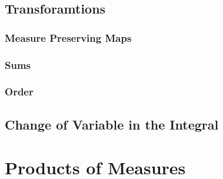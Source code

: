 \documentclass[12pt]{scrartcl}
\renewcommand{\.}{\; . \;}
\begin{document}
\subsection{Transforamtions}
\subsubsection{Measure Preserving Maps}
\subsubsection{Sums}
\subsubsection{Order}
\subsection{Change of Variable in the Integral}
\newpage
\section{Products of Measures}
\end{document}
